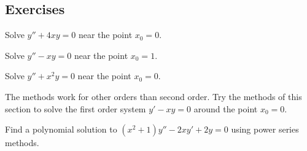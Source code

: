 \documentclass[12pt]{book}
\begin{document}
\subsection{Exercises}

\begin{exercise}
Solve $y''+4xy = 0$ near the point $x_0 = 0$.
\end{exercise}

\begin{exercise}
Solve $y''-xy = 0$ near the point $x_0 = 1$.
\end{exercise}

\begin{exercise}
Solve $y''+x^2y = 0$ near the point $x_0 = 0$.
\end{exercise}

\begin{exercise}
The methods work for other orders than second order.  Try the methods
of this section to solve the first order system $y'-xy = 0$ around
the point $x_0 = 0$.
\end{exercise}

\begin{exercise}
Find a polynomial solution to $(x^2+1) y''-2xy'+2y = 0$ using
power series methods.
\end{exercise}
\end{document}
